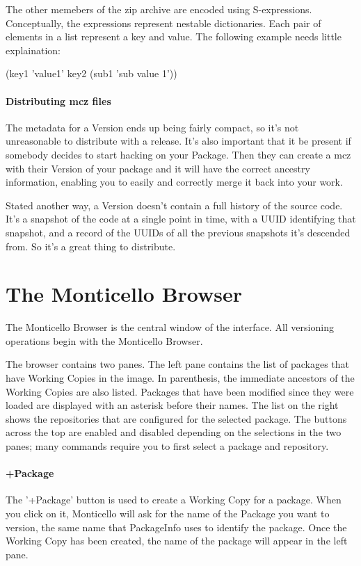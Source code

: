 The other memebers of the zip archive are encoded using S-expressions. Conceptually, the expressions represent nestable dictionaries. Each pair of elements in a list represent a key and value. The following example needs little explaination:

(key1 'value1' key2 (sub1 'sub value 1'))

\paragraph{Distributing mcz files}

The metadata for a Version ends up being fairly compact, so it's not unreasonable to distribute with a release. It's also important that it be present if somebody decides to start hacking on your Package. Then they can create a mcz with their Version of your package and it will have the correct ancestry information, enabling you to easily and correctly merge it back into your work.

Stated another way, a Version doesn't contain a full history of the source code. It's a snapshot of the code at a single point in time, with a UUID identifying that snapshot, and a record of the UUIDs of all the previous snapshots it's descended from. So it's a great thing to distribute.

\section{The Monticello Browser}

The Monticello Browser is the central window of the interface. All versioning operations begin with the Monticello Browser.

The browser contains two panes. The left pane contains the list of packages that have Working Copies in the image. In parenthesis, the immediate ancestors of the Working Copies are also listed. Packages that have been modified since they were loaded are displayed with an asterisk before their names. The list on the right shows the repositories that are configured for the selected package. The buttons across the top are enabled and disabled depending on the selections in the two panes; many commands require you to first select a package and repository.

\paragraph{+Package}

The '+Package' button is used to create a Working Copy for a package. When you click on it, Monticello will ask for the name of the Package you want to version, the same name that PackageInfo uses to identify the package. Once the Working Copy has been created, the name of the package will appear in the left pane.

